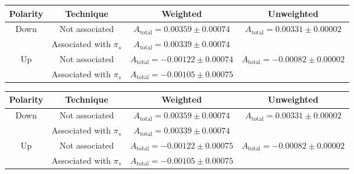 \documentclass{article}
\begin{document}
        \begin{center}
                \begin{tabular}{c|c|c|c}
                        Polarity & Technique & Weighted & Unweighted\\
                        \hline\hline
                        \multirow{2}{*}{Down} & Not associated & $A_\text{total} = 0.00359 \pm 0.00074$ & \multirow{2}{*}{$A_\text{total} = 0.00331 \pm 0.00002$}\\
                        \cline{2-3}
                        & Associated with $\pi_s$ & $A_\text{total} = 0.00339 \pm 0.00074$ & \\
                        \hline
                        \multirow{2}{*}{Up} & Not associated & $A_\text{total} = - 0.00122 \pm 0.00074$ & \multirow{2}{*}{$A_\text{total} = - 0.00082 \pm 0.00002$}\\
                        \cline{2-3}
                        & Associated with $\pi_s$ & $A_\text{total} = - 0.00105 \pm 0.00075$ & \\
                \end{tabular}
                \label{tab:2016}
        \end{center}
        \begin{center}
                \begin{tabular}{c|c|c|c}
                        Polarity & Technique & Weighted & Unweighted\\
                        \hline\hline
                        \multirow{2}{*}{Down} & Not associated & $A_\text{total} = 0.00359 \pm 0.00074$ & \multirow{2}{*}{$A_\text{total} = 0.00331 \pm 0.00002$}\\
                        \cline{2-3}
                        & Associated with $\pi_s$ & $A_\text{total} = 0.00339 \pm 0.00074$ & \\
                        \hline
                        \multirow{2}{*}{Up} & Not associated & $A_\text{total} = - 0.00122 \pm 0.00075$ & \multirow{2}{*}{$A_\text{total} = - 0.00082 \pm 0.00002$}\\
                        \cline{2-3}
                        & Associated with $\pi_s$ & $A_\text{total} = - 0.00105 \pm 0.00075$ & \\
                \end{tabular}
                \label{tab:2017}
        \end{center}
\end{document}
